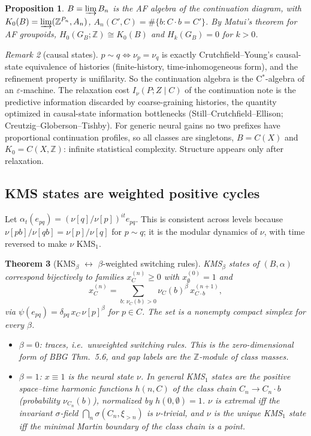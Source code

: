 \documentclass[11pt]{article}
\newtheorem{theorem}{Theorem}[section]
\newtheorem{proposition}[theorem]{Proposition}
\theoremstyle{definition}
\theoremstyle{remark}
\newtheorem{remark}[theorem]{Remark}
\newcommand{\Z}{\mathbb Z}
\begin{document}
\begin{proposition}
$B=\varinjlim B_n$ is the AF algebra of the continuation diagram, with $K_0(B)=\varinjlim(\Z^{P_n},A_n)$, $A_n(C',C)=\#\{b:C\cdot b=C'\}$. By Matui's theorem for AF groupoids, $H_0(G_B;\Z)\cong K_0(B)$ and $H_{k}(G_B)=0$ for $k>0$.
\end{proposition}

\begin{remark}[causal states]
$p\sim q\iff\nu_p=\nu_q$ is exactly Crutchfield--Young's causal-state equivalence of histories (finite-history, time-inhomogeneous form), and the refinement property is unifilarity. So the continuation algebra is the C$^*$-algebra of an $\varepsilon$-machine. The relaxation cost $I_\nu(P;Z\mid C)$ of the continuation note is the predictive information discarded by coarse-graining histories, the quantity optimized in causal-state information bottlenecks (Still--Crutchfield--Ellison; Creutzig--Globerson--Tishby). For generic neural gains no two prefixes have proportional continuation profiles, so all classes are singletons, $B=C(X)$ and $K_0=C(X,\Z)$: infinite statistical complexity. Structure appears only after relaxation.
\end{remark}

\subsection{KMS states are weighted positive cycles}

Let $\alpha_t(e_{pq})=(\nu[q]/\nu[p])^{it}e_{pq}$. This is consistent across levels because $\nu[pb]/\nu[qb]=\nu[p]/\nu[q]$ for $p\sim q$; it is the modular dynamics of $\nu$, with time reversed to make $\nu$ KMS$_1$.

\begin{theorem}[KMS$_\beta$ $\leftrightarrow$ $\beta$-weighted switching rules]\label{thm:kms}
KMS$_\beta$ states of $(B,\alpha)$ correspond bijectively to families $x^{(n)}_C\ge0$ with $x^{(0)}_\emptyset=1$ and
\[x^{(n)}_C=\sum_{b:\,\nu_C(b)>0}\nu_C(b)^\beta\,x^{(n+1)}_{C\cdot b},\]
via $\psi(e_{pq})=\delta_{pq}\,x_C\,\nu[p]^\beta$ for $p\in C$. The set is a nonempty compact simplex for every $\beta$.
\begin{itemize}
\item $\beta=0$: traces, i.e.\ unweighted switching rules. This is the zero-dimensional form of BBG Thm.~5.6, and gap labels are the $\Z$-module of class masses.
\item $\beta=1$: $x\equiv1$ is the neural state $\nu$. In general KMS$_1$ states are the positive space--time harmonic functions $h(n,C)$ of the \emph{class chain} $C_n\to C_n\cdot b$ (probability $\nu_{C_n}(b)$), normalized by $h(0,\emptyset)=1$. $\nu$ is extremal iff the invariant $\sigma$-field $\bigcap_n\sigma(C_n,\xi_{>n})$ is $\nu$-trivial, and $\nu$ is the unique KMS$_1$ state iff the minimal Martin boundary of the class chain is a point.
\end{itemize}
\end{theorem}
\end{document}
